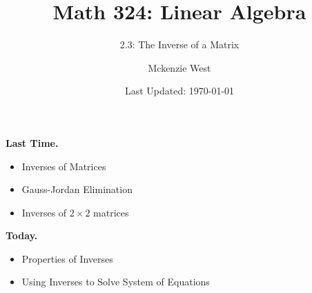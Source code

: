 \documentclass[handout]{beamer}
\theoremstyle{definition}
\begin{document}
	\title{Math 324: Linear Algebra}
	\subtitle{2.3: The Inverse of a Matrix}
	\author{Mckenzie West}
	\date{Last Updated: \today}
\begin{frame}
\maketitle
\end{frame}

\begin{frame}{\insertframenumber}
	\begin{block}{\textbf{Last Time.}}
	\begin{itemize}[label=--]
		\item Inverses of Matrices
		\item Gauss-Jordan Elimination
		\item Inverses of $2\times2$ matrices
	\end{itemize}
	\end{block}
\begin{block}{\textbf{Today.}}
	\begin{itemize}[label=--]
		\item Properties of Inverses
		\item Using Inverses to Solve System of Equations
	\end{itemize}
\end{block}
\end{frame}
\end{document}
